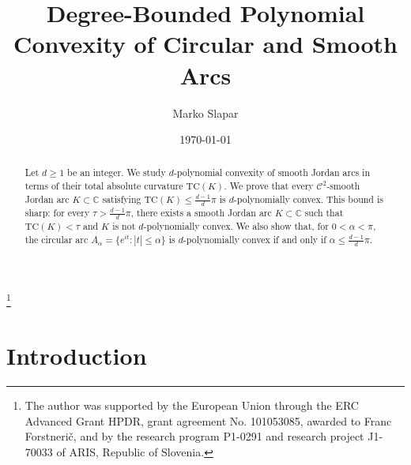 \documentclass[reqno]{amsart}
\theoremstyle{definition}
\newcommand{\C}{\mathbb{C}}
\newcommand{\T}{\mathrm{TC}}
\newcommand{\cC}{\mathcal{C}}
\numberwithin{equation}{section}
\begin{document}
\title[Degree-Bounded Polynomial Convexity of Circular and Smooth Arcs]
{Degree-Bounded Polynomial Convexity of Circular and Smooth Arcs}
\author[Marko Slapar]{Marko Slapar}
\address{Marko Slapar, Faculty of Mathematics and Physics\\ University of Ljubljana \\ Jadranska 19\\1000 Ljubljana, Slovenia\\ \newline
Faculty of Education\\ University of Ljubljana \\ Kardeljeva plo\v{s}\v{c}ad 16\\1000 Ljubljana, Slovenia\\
and\newline
  Institute of Mathematics, Physics and Mechanics\\Jadranska
  19\\1000 Ljubljana, Slovenia}
\date{\today}

\thanks{The author was supported by the European Union through the ERC Advanced Grant HPDR, grant agreement No. 101053085, 
awarded to Franc Forstneri\v{c}, and by the research program P1-0291 and research project J1-70033 of ARIS, Republic of Slovenia.}

\begin{abstract} 
Let $d\ge 1$ be an integer. We study $d$-polynomial convexity of smooth Jordan arcs in terms of their total absolute curvature $\T(K)$. We prove that every $\cC^2$-smooth Jordan arc $K\subset\C$ satisfying $\T(K)\le \frac{d-1}{d}\pi$ is $d$-polynomially convex. This bound is sharp: for every $\tau>\frac{d-1}{d}\pi$, there exists a smooth Jordan arc $K\subset\C$ such that $\T(K)<\tau$ and $K$ is not $d$-polynomially convex. We also show that, for $0<\alpha<\pi$, the circular arc $A_\alpha=\{e^{it}:|t|\le \alpha\}$ is $d$-polynomially convex if and only if $\alpha\le \frac{d-1}{d}\pi$.\end{abstract}
\maketitle

   
\section{Introduction} 
\end{document}
